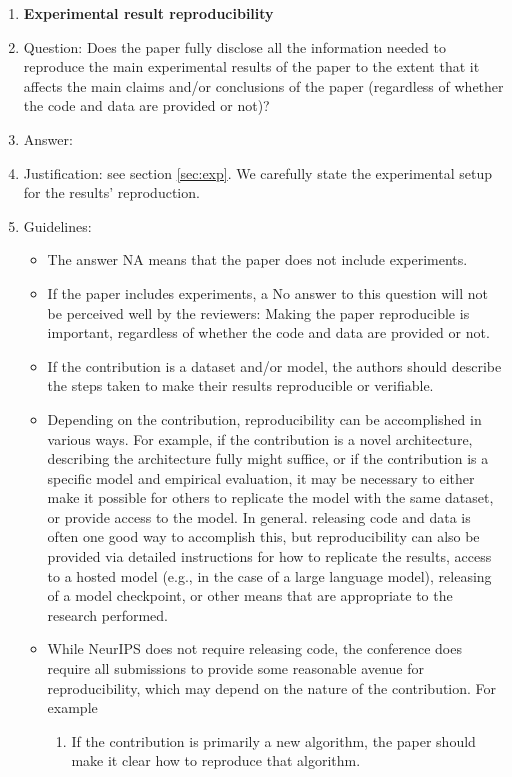 \documentclass{article}
\theoremstyle{plain}
\theoremstyle{definition}
\theoremstyle{remark}
\begin{document}
\begin{enumerate}
    \item {\bf Experimental result reproducibility}
    \item[] Question: Does the paper fully disclose all the information needed to reproduce the main experimental results of the paper to the extent that it affects the main claims and/or conclusions of the paper (regardless of whether the code and data are provided or not)?
    \item[] Answer: \answerYes{} %
    \item[] Justification: see section \ref{sec:exp}. We carefully state the experimental setup for the results' reproduction.
    \item[] Guidelines:
    \begin{itemize}
        \item The answer NA means that the paper does not include experiments.
        \item If the paper includes experiments, a No answer to this question will not be perceived well by the reviewers: Making the paper reproducible is important, regardless of whether the code and data are provided or not.
        \item If the contribution is a dataset and/or model, the authors should describe the steps taken to make their results reproducible or verifiable. 
        \item Depending on the contribution, reproducibility can be accomplished in various ways. For example, if the contribution is a novel architecture, describing the architecture fully might suffice, or if the contribution is a specific model and empirical evaluation, it may be necessary to either make it possible for others to replicate the model with the same dataset, or provide access to the model. In general. releasing code and data is often one good way to accomplish this, but reproducibility can also be provided via detailed instructions for how to replicate the results, access to a hosted model (e.g., in the case of a large language model), releasing of a model checkpoint, or other means that are appropriate to the research performed.
        \item While NeurIPS does not require releasing code, the conference does require all submissions to provide some reasonable avenue for reproducibility, which may depend on the nature of the contribution. For example
        \begin{enumerate}
            \item If the contribution is primarily a new algorithm, the paper should make it clear how to reproduce that algorithm.

\end{enumerate}
\end{itemize}
\end{enumerate}
\end{document}
